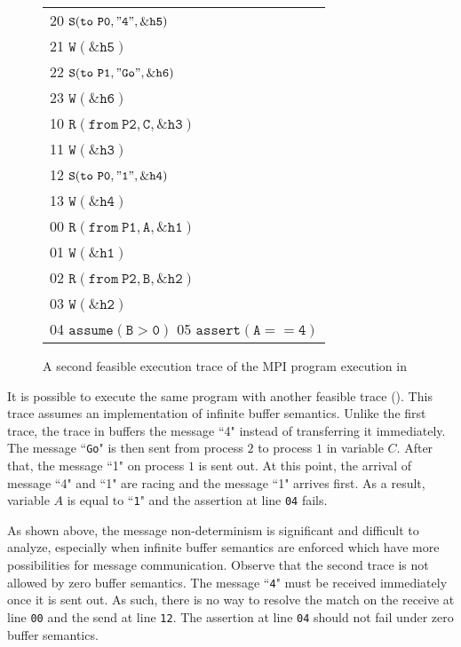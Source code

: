 \begin{figure}[t]
\begin{center}
\setlength{\tabcolsep}{2pt}
\small \begin{tabular}[t]{l}
20 $\mathtt{S(to\ P0, "4", \&h5)}$ \\
21 $\mathtt{W(\&h5)}$\\
22 $\mathtt{S(to\ P1, "Go", \&h6)}$ \\
23 $\mathtt{W(\&h6)}$ \\
\hline
10 $\mathtt{R(from\ P2, C, \&h3)}$ \\
11 $\mathtt{W(\&h3)}$ \\
12 $\mathtt{S(to\ P0, "1", \&h4)}$ \\
13 $\mathtt{W(\&h4)}$ \\
\hline
00 $\mathtt{R(from\ P1, A, \&h1)}$ \\
01 $\mathtt{W(\&h1)}$ \\
02 $\mathtt{R(from\ P2, B, \&h2)}$ \\
03 $\mathtt{W(\&h2)}$ \\
04 $\mathtt{assume(B > 0)}$
05 $\mathtt{assert(A == 4)}$ \\
\hline
\end{tabular}
\end{center}
\caption{A second feasible execution trace of the MPI program execution in }
\label{fig:trace2}
\end{figure}

It is possible to execute the same program with another feasible trace (). This trace assumes an implementation of infinite buffer semantics. Unlike the first trace, the trace in  buffers the message ``4" instead of transferring it immediately. The message ``\texttt{Go}" is then sent from process $2$ to process $1$ in variable $C$. After that, the message ``1" on process $1$ is sent out. At this point, the arrival of message ``4" and ``1" are racing and the message ``1" arrives first. As a result, variable $A$ is equal to ``\texttt{1}" and the assertion at line \texttt{04} fails.

As shown above, the message non-determinism is significant and difficult to analyze, especially when infinite buffer semantics are enforced which have more possibilities for message communication. Observe that the second trace is not allowed by zero buffer semantics. The message ``\texttt{4}" must be received immediately once it is sent out. As such, there is no way to resolve the match on the receive at line \texttt{00} and the send at line \texttt{12}.  The assertion at line \texttt{04} should not fail under zero buffer semantics. 


